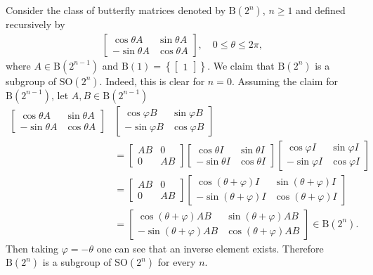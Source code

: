 \documentclass{amsart}
\theoremstyle{definition}
\theoremstyle{remark}
\numberwithin{equation}{section}
\begin{document}
Consider the class of butterfly matrices denoted by $\mathrm B(2^n)$, $n \geq 1$ and defined recursively by
\begin{align}
\begin{bmatrix} \cos \theta A & \sin \theta A \\ - \sin \theta A & \cos \theta A \end{bmatrix}, \quad 0 \leq \theta \leq 2 \pi,
\end{align}
where $A \in \mathrm B(2^{n-1})$ and  $\mathrm B(1) = \left\{ \begin{bmatrix} 1 \end{bmatrix} \right\}$.  We claim that $\mathrm B(2^n)$ is a subgroup of $\mathrm{SO}(2^n)$.  Indeed, this is clear for $n = 0$.  Assuming the claim for $\mathrm B(2^{n-1})$, let $A,B \in \mathrm B(2^{n-1})$
\begin{align}
\begin{bmatrix} \cos \theta A & \sin \theta A \\ - \sin \theta A & \cos \theta A \end{bmatrix}&\begin{bmatrix} \cos \varphi B & \sin \varphi B \\ - \sin \varphi B & \cos \varphi B \end{bmatrix} \\
&= \begin{bmatrix} AB & 0 \\ 0 & AB \end{bmatrix} \begin{bmatrix}\cos \theta I & \sin \theta I \\ - \sin \theta I & \cos \theta I \end{bmatrix}\begin{bmatrix} \cos \varphi I & \sin \varphi I \\ - \sin \varphi I & \cos \varphi I \end{bmatrix}\\
& = \begin{bmatrix} AB & 0 \\ 0 & AB \end{bmatrix} \begin{bmatrix}\cos (\theta + \varphi) I & \sin (\theta+ \varphi) I \\ - \sin (\theta + \varphi) I & \cos (\theta + \varphi) I \end{bmatrix}\\
& = \begin{bmatrix}\cos (\theta + \varphi) AB & \sin (\theta+ \varphi) AB \\ - \sin (\theta + \varphi) AB & \cos (\theta + \varphi) AB \end{bmatrix} \in \mathrm B(2^n).
\end{align}
Then taking $\varphi = - \theta$ one can see that an inverse element exists. Therefore $\mathrm B(2^n)$ is a subgroup of $\mathrm{SO}(2^n)$ for every $n$.
\end{document}
